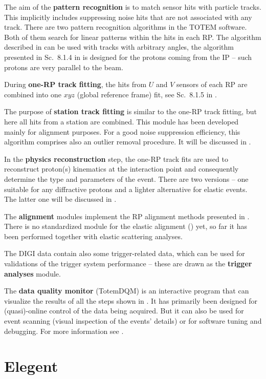 \> The aim of the {\bf pattern recognition} is to match sensor hits with particle tracks. This implicitly includes suppressing noise hits that are not associated with any track. There are two pattern recognition algorithms in the TOTEM software. Both of them search for linear patterns within the hits in each RP. The algorithm described in  can be used with tracks with arbitrary angles, the algorithm presented in Sc.~8.1.4 in  is designed for the protons coming from the IP -- such protons are very parallel to the beam.

\> During {\bf one-RP track fitting}, the hits from $U$ and $V$ sensors of each RP are combined into one $xyz$ (global reference frame) fit, see Sc.~8.1.5 in .

\> The purpose of {\bf station track fitting} is similar to the one-RP track fitting, but here all hits from a station are combined. This module has been developed mainly for alignment purposes. For a good noise suppression efficiency, this algorithm comprises also an outlier removal procedure. It will be discussed in .

\> In the {\bf physics reconstruction} step, the one-RP track fits are used to reconstruct proton(s) kinematics at the interaction point and consequently determine the type and parameters of the event. There are two versions -- one suitable for any diffractive protons and a lighter alternative for elastic events. The latter one will be discussed in .

\> The {\bf alignment} modules implement the RP alignment methods presented in . There is no standardized module for the elastic alignment () yet, so far it has been performed together with elastic scattering analyses.

\> The DIGI data contain also some trigger-related data, which can be used for validations of the trigger system performance -- these are drawn as the {\bf trigger analyses} module.

\> The {\bf data quality monitor} (TotemDQM) is an interactive program that can visualize the results of all the steps shown in . It has primarily been designed for (quasi)-online control of the data being acquired. But it can also be used for event scanning (visual inspection of the events' details) or for software tuning and debugging. For more information see .



\section[elegent]{Elegent}

